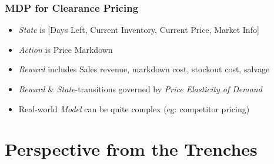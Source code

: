 \documentclass[handout]{beamer}
\begin{document}
\begin{frame}
\frametitle{MDP for Clearance Pricing}
\pause
\begin{itemize}
\item {\em State} is [Days Left, Current Inventory, Current Price, Market Info]
\item {\em Action} is Price Markdown
\item {\em Reward} includes Sales revenue, markdown cost, stockout cost, salvage
\item {\em Reward} \& {\em State}-transitions governed by {\em Price Elasticity of Demand}
\item Real-world {\em Model} can be quite complex (eg: competitor pricing)
\end{itemize}
\end{frame}

\section{Perspective from the Trenches}
\end{document}
